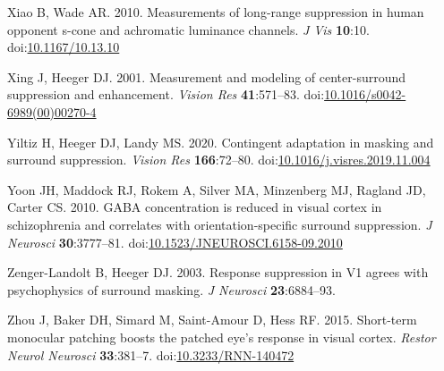 \documentclass[]{article}
\begin{document}
\leavevmode\hypertarget{ref-Xiao2010}{}%
Xiao B, Wade AR. 2010. Measurements of long-range suppression in human opponent s-cone and achromatic luminance channels. \emph{J Vis} \textbf{10}:10. doi:\href{https://doi.org/10.1167/10.13.10}{10.1167/10.13.10}

\leavevmode\hypertarget{ref-Xing2001}{}%
Xing J, Heeger DJ. 2001. Measurement and modeling of center-surround suppression and enhancement. \emph{Vision Res} \textbf{41}:571--83. doi:\href{https://doi.org/10.1016/s0042-6989(00)00270-4}{10.1016/s0042-6989(00)00270-4}

\leavevmode\hypertarget{ref-Yiltiz2020}{}%
Yiltiz H, Heeger DJ, Landy MS. 2020. Contingent adaptation in masking and surround suppression. \emph{Vision Res} \textbf{166}:72--80. doi:\href{https://doi.org/10.1016/j.visres.2019.11.004}{10.1016/j.visres.2019.11.004}

\leavevmode\hypertarget{ref-Yoon2010}{}%
Yoon JH, Maddock RJ, Rokem A, Silver MA, Minzenberg MJ, Ragland JD, Carter CS. 2010. GABA concentration is reduced in visual cortex in schizophrenia and correlates with orientation-specific surround suppression. \emph{J Neurosci} \textbf{30}:3777--81. doi:\href{https://doi.org/10.1523/JNEUROSCI.6158-09.2010}{10.1523/JNEUROSCI.6158-09.2010}

\leavevmode\hypertarget{ref-Zenger-Landolt2003}{}%
Zenger-Landolt B, Heeger DJ. 2003. Response suppression in V1 agrees with psychophysics of surround masking. \emph{J Neurosci} \textbf{23}:6884--93.

\leavevmode\hypertarget{ref-Zhou2015}{}%
Zhou J, Baker DH, Simard M, Saint-Amour D, Hess RF. 2015. Short-term monocular patching boosts the patched eye's response in visual cortex. \emph{Restor Neurol Neurosci} \textbf{33}:381--7. doi:\href{https://doi.org/10.3233/RNN-140472}{10.3233/RNN-140472}
\end{document}
